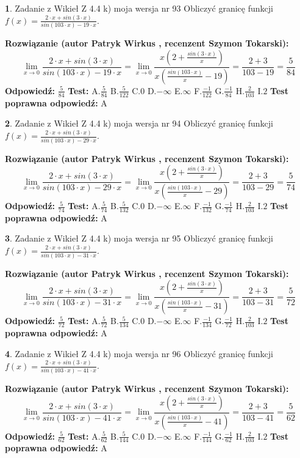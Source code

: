 \documentclass[12pt, a4paper]{article}
\theoremstyle{definition} %
\newtheorem{zad}{}
\newcommand{\zadStart}[1]{\begin{zad}#1\newline}
\newcommand{\zadStop}{\end{zad}}
\newcommand{\rozwStart}[2]{\noindent \textbf{Rozwiązanie (autor #1 , recenzent #2): }\newline}
\newcommand{\rozwStop}{\newline}
\newcommand{\odpStart}{\noindent \textbf{Odpowiedź:}\newline}
\newcommand{\odpStop}{\newline}
\newcommand{\testStart}{\noindent \textbf{Test:}\newline}
\newcommand{\testStop}{\newline}
\newcommand{\kluczStart}{\noindent \textbf{Test poprawna odpowiedź:}\newline}
\newcommand{\kluczStop}{\newline}
\begin{document}
\zadStart{Zadanie z Wikieł Z 4.4 k) moja wersja nr 93}
Obliczyć granicę funkcji $f(x)=\frac{2\cdot x +sin(3\cdot x)}{sin(103\cdot x) -19\cdot x}$.
\zadStop
\rozwStart{Patryk Wirkus}{Szymon Tokarski}
$$\lim\limits_{x\to 0}\frac{2\cdot x +sin(3\cdot x)}{sin(103\cdot x) -19\cdot x}
=\lim\limits_{x\to 0}\frac{x(2+\frac{sin(3\cdot x)}{x})}{x(\frac{sin(103\cdot x)}{x}-19)}
=\frac{2+3}{103-19} = \frac{5}{84}$$
\rozwStop
\odpStart
$\frac{5}{84}$
\odpStop
\testStart
A.$\frac{5}{84}$
B.$\frac{5}{122}$
C.$0$
D.$-\infty$
E.$\infty$
F.$\frac{-1}{122}$
G.$\frac{-1}{84}$
H.$\frac{2}{103}$
I.$2$
\testStop
\kluczStart
A
\kluczStop



\zadStart{Zadanie z Wikieł Z 4.4 k) moja wersja nr 94}
Obliczyć granicę funkcji $f(x)=\frac{2\cdot x +sin(3\cdot x)}{sin(103\cdot x) -29\cdot x}$.
\zadStop
\rozwStart{Patryk Wirkus}{Szymon Tokarski}
$$\lim\limits_{x\to 0}\frac{2\cdot x +sin(3\cdot x)}{sin(103\cdot x) -29\cdot x}
=\lim\limits_{x\to 0}\frac{x(2+\frac{sin(3\cdot x)}{x})}{x(\frac{sin(103\cdot x)}{x}-29)}
=\frac{2+3}{103-29} = \frac{5}{74}$$
\rozwStop
\odpStart
$\frac{5}{74}$
\odpStop
\testStart
A.$\frac{5}{74}$
B.$\frac{5}{132}$
C.$0$
D.$-\infty$
E.$\infty$
F.$\frac{-1}{132}$
G.$\frac{-1}{74}$
H.$\frac{2}{103}$
I.$2$
\testStop
\kluczStart
A
\kluczStop



\zadStart{Zadanie z Wikieł Z 4.4 k) moja wersja nr 95}
Obliczyć granicę funkcji $f(x)=\frac{2\cdot x +sin(3\cdot x)}{sin(103\cdot x) -31\cdot x}$.
\zadStop
\rozwStart{Patryk Wirkus}{Szymon Tokarski}
$$\lim\limits_{x\to 0}\frac{2\cdot x +sin(3\cdot x)}{sin(103\cdot x) -31\cdot x}
=\lim\limits_{x\to 0}\frac{x(2+\frac{sin(3\cdot x)}{x})}{x(\frac{sin(103\cdot x)}{x}-31)}
=\frac{2+3}{103-31} = \frac{5}{72}$$
\rozwStop
\odpStart
$\frac{5}{72}$
\odpStop
\testStart
A.$\frac{5}{72}$
B.$\frac{5}{134}$
C.$0$
D.$-\infty$
E.$\infty$
F.$\frac{-1}{134}$
G.$\frac{-1}{72}$
H.$\frac{2}{103}$
I.$2$
\testStop
\kluczStart
A
\kluczStop



\zadStart{Zadanie z Wikieł Z 4.4 k) moja wersja nr 96}
Obliczyć granicę funkcji $f(x)=\frac{2\cdot x +sin(3\cdot x)}{sin(103\cdot x) -41\cdot x}$.
\zadStop
\rozwStart{Patryk Wirkus}{Szymon Tokarski}
$$\lim\limits_{x\to 0}\frac{2\cdot x +sin(3\cdot x)}{sin(103\cdot x) -41\cdot x}
=\lim\limits_{x\to 0}\frac{x(2+\frac{sin(3\cdot x)}{x})}{x(\frac{sin(103\cdot x)}{x}-41)}
=\frac{2+3}{103-41} = \frac{5}{62}$$
\rozwStop
\odpStart
$\frac{5}{62}$
\odpStop
\testStart
A.$\frac{5}{62}$
B.$\frac{5}{144}$
C.$0$
D.$-\infty$
E.$\infty$
F.$\frac{-1}{144}$
G.$\frac{-1}{62}$
H.$\frac{2}{103}$
I.$2$
\testStop
\kluczStart
A
\kluczStop
\end{document}
